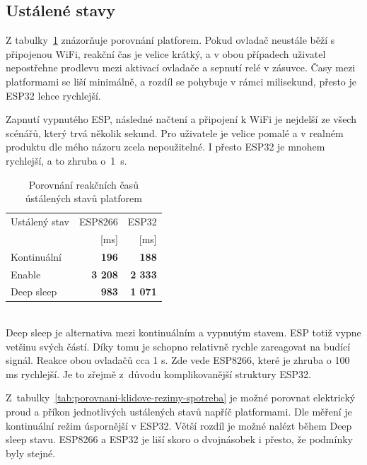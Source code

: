 \documentclass[a4paper, 12pt]{report}
\begin{document}
    \subsection{Ustálené stavy}
    Z tabulky~\ref{tab:porovnani-klidove-rezimy-cas} znázorňuje porovnání platforem.
    Pokud ovladač neustále běží s připojenou WiFi, reakční čas je velice krátký, a v obou případech uživatel nepostřehne prodlevu mezi aktivací ovladače a sepnutí relé v zásuvce.
    Časy mezi platformami se liší minimálně, a rozdíl se pohybuje v rámci milisekund, přesto je ESP32 lehce rychlejší. \par
    Zapnutí vypnutého ESP, následné načtení a připojení k WiFi je nejdelší ze všech scénářů, který trvá několik sekund.
    Pro uživatele je velice pomalé a v realném produktu dle mého názoru zcela nepoužitelné.
    I přesto ESP32 je mnohem rychlejší, a to zhruba o~1~\si{s}.
    \begin{table}[h!]
        \centering
        \caption{Porovnání reakčních časů ústálených stavů platforem}
        \begin{tabular}{||l|r r||}
            \hline
            Ustálený stav & ESP8266        & ESP32          \\
            & [ms]           & [ms]           \\
            \hline
            Kontinuální   & \textbf{196}   & \textbf{188}   \\
            Enable        & \textbf{3 208} & \textbf{2 333} \\
            Deep sleep    & \textbf{983}   & \textbf{1 071} \\
            \hline
        \end{tabular}
        \label{tab:porovnani-klidove-rezimy-cas}
    \end{table}\\
    Deep sleep je alternativa mezi kontinuálním a vypnutým stavem.
    ESP totiž vypne vetšinu svých částí.
    Díky tomu je schopno relativně rychle zareagovat na budící signál.
    Reakce obou ovladačů cca 1 \si{s}.
    Zde vede ESP8266, které je zhruba o 100 \si{ms} rychlejší.
    Je to zřejmě z~důvodu komplikovanější struktury ESP32.\par
    Z~tabulky~\ref{tab:porovnani-klidove-rezimy-spotreba} je možné porovnat elektrický proud a příkon jednotlivých ustálených stavů napříč platformami.
    Dle měření je kontinuální režim úspornější v ESP32.
    Větší rozdíl je možné nalézt během Deep sleep stavu.
    ESP8266 a ESP32 je liší skoro o dvojnásobek i přesto, že podmínky byly stejné.
\end{document}
